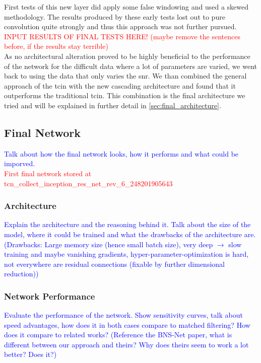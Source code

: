 First tests of this new layer did apply some false windowing and used a skewed methodology. The results produced by these early tests lost out to pure convolution quite strongly and thus this approach was not further pursued. \textcolor{red}{INPUT RESULTS OF FINAL TESTS HERE! (maybe remove the sentences before, if the results stay terrible)}\medskip\\
As no architectural alteration proved to be highly beneficial to the performance of the network for the difficult data where a lot of parameters are varied, we went back to using the data that only varies the \gls{snr}. We than combined the general approach of the \gls{tcin} with the new cascading architecture and found that it outperforms the traditional \gls{tcin}. This combination is the final architecture we tried and will be explained in further detail in \autoref{sec:final_architecture}.


\subsection{Final Network}
\textcolor{blue}{Talk about how the final network looks, how it performs and what could be imporved.}\\
\textcolor{red}{First final network stored at tcn\_collect\_inception\_res\_net\_rev\_6\_248201905643}
\subsubsection{Architecture}\label{sec:final_architecture}
\textcolor{blue}{Explain the architecture and the reasoning behind it. Talk about the size of the model, where it could be trained and what the drawbacks of the architecture are. (Drawbacks: Large memory size (hence small batch size), very deep $\to$ slow training and maybe vanishing gradients, hyper-parameter-optimization is hard, not everywhere are residual connections (fixable by further dimensional reduction))}
\subsubsection{Network Performance}\label{sec:network_performance}
\textcolor{blue}{Evaluate the performance of the network. Show sensitivity curves, talk about speed advantages, how does it in both cases compare to matched filtering? How does it compare to related works? (Reference the BNS-Net paper, what is different between our approach and theirs? Why does theirs seem to work a lot better? Does it?)}
